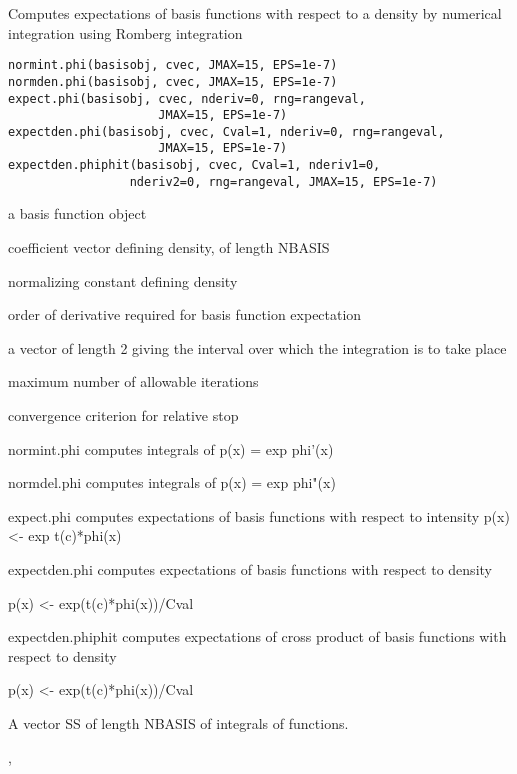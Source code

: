 \begin{Description}\relax
Computes expectations of basis functions with respect to a density
by numerical integration using Romberg integration
\end{Description}
\begin{Usage}
\begin{verbatim}
normint.phi(basisobj, cvec, JMAX=15, EPS=1e-7) 
normden.phi(basisobj, cvec, JMAX=15, EPS=1e-7) 
expect.phi(basisobj, cvec, nderiv=0, rng=rangeval,
                     JMAX=15, EPS=1e-7) 
expectden.phi(basisobj, cvec, Cval=1, nderiv=0, rng=rangeval,
                     JMAX=15, EPS=1e-7)
expectden.phiphit(basisobj, cvec, Cval=1, nderiv1=0,
                 nderiv2=0, rng=rangeval, JMAX=15, EPS=1e-7) 
\end{verbatim}
\end{Usage}
\begin{Arguments}
\begin{ldescription}
\item[\code{basisobj}] a basis function object 

\item[\code{cvec}] coefficient vector defining density, of length NBASIS 

\item[\code{Cval}] normalizing constant defining density 

\item[\code{nderiv, nderiv1, nderiv2}] order of derivative required for basis function expectation


\item[\code{rng}] a vector of length 2 giving the interval over which the integration is
to take place

\item[\code{JMAX}] maximum number of allowable iterations 

\item[\code{EPS}] convergence criterion for relative stop 

\end{ldescription}
\end{Arguments}
\begin{Details}\relax
normint.phi computes integrals of  
p(x) = exp phi'(x) 

normdel.phi computes integrals of
p(x) = exp phi"(x) 

expect.phi computes expectations of basis functions with respect to
intensity
p(x) <- exp t(c)*phi(x)


expectden.phi computes expectations of basis functions with respect
to density

p(x) <- exp(t(c)*phi(x))/Cval

expectden.phiphit computes expectations of cross product of basis
functions with respect to density

p(x) <- exp(t(c)*phi(x))/Cval
\end{Details}
\begin{Value}
A vector SS of length NBASIS of integrals of functions.
\end{Value}
\begin{SeeAlso}\relax
{},
\end{SeeAlso}

